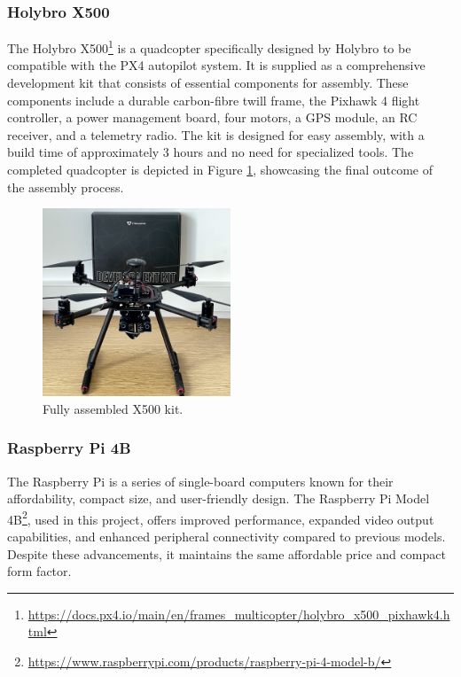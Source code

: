 \subsubsection{Holybro X500}
\label{subsec:x500}

The Holybro X500\footnote{\url{https://docs.px4.io/main/en/frames_multicopter/holybro_x500_pixhawk4.html}} is a quadcopter specifically designed by Holybro to be compatible with the PX4 autopilot system. It is supplied as a comprehensive development kit that consists of essential components for assembly. These components include a durable carbon-fibre twill frame, the Pixhawk 4 flight controller, a power management board, four motors, a GPS module, an RC receiver, and a telemetry radio. The kit is designed for easy assembly, with a build time of approximately 3 hours and no need for specialized tools. The completed quadcopter is depicted in Figure \ref{fig:x500}, showcasing the final outcome of the assembly process.

\begin{figure}[H]
  \centering
  \includegraphics[width=0.5\textwidth,keepaspectratio]{img/X500-assembled.jpg}
  \caption{Fully assembled X500 kit.}
  \label{fig:x500}
\end{figure}

\subsubsection{Raspberry Pi 4B}
\label{subsec:rpi}

The Raspberry Pi is a series of single-board computers known for their affordability, compact size, and user-friendly design. The Raspberry Pi Model 4B\footnote{\url{https://www.raspberrypi.com/products/raspberry-pi-4-model-b/}}, used in this project, offers improved performance, expanded video output capabilities, and enhanced peripheral connectivity compared to previous models. Despite these advancements, it maintains the same affordable price and compact form factor.

